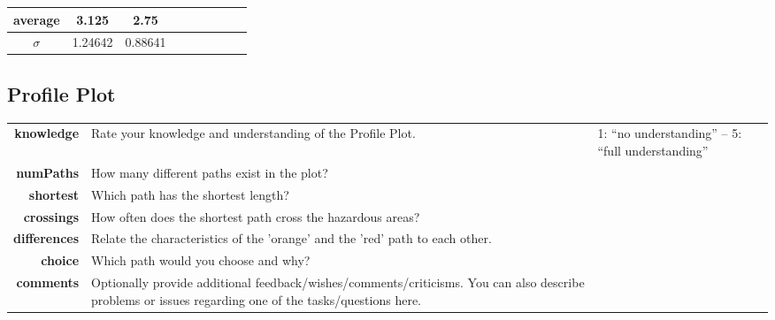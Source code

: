 \documentclass[8pt]{article}
\begin{document}
\begin{longtable}{|c|c|c|c|c|p{4cm}|p{3cm}|p{2.5cm}|p{2.5cm}|}
average & 3.125 & 2.75 & & & & & & \\ \hline
$\sigma$ & 1.24642 & 0.88641 & & & & & & \\ \hline
 \end{longtable}

\newpage
%
%
%
%
\subsection*{Profile Plot}
\begin{longtable}{r p{14cm} l}
\hline
\textbf{knowledge} & Rate your knowledge and understanding of the Profile Plot. & 1: ``no understanding'' -- 5: ``full understanding''\\
\textbf{numPaths} & How many different paths exist in the plot?\\
\textbf{shortest} & Which path has the shortest length?\\
\textbf{crossings} & How often does the shortest path cross the hazardous areas?\\
\textbf{differences} & Relate the characteristics of the 'orange' and the 'red' path to each other.\\
\textbf{choice} & Which path would you choose and why?\\
\textbf{comments} & Optionally provide additional feedback/wishes/comments/criticisms.
You can also describe problems or issues regarding one of the tasks/questions here.\\
\hline
\end{longtable}
\end{document}
